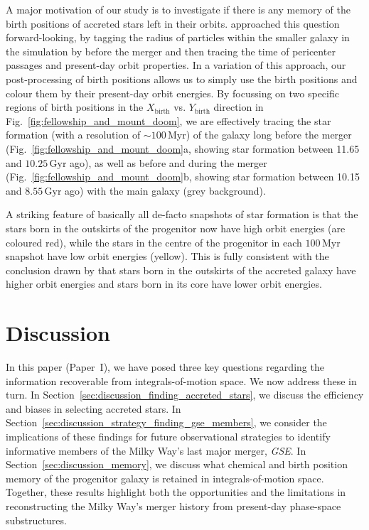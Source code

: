 \documentclass[fleqn,usenatbib]{mnras}
\begin{document}
A major motivation of our study is to investigate if there is any memory of the birth positions of accreted stars left in their orbits. \citet{Skuladottir2025} approached this question forward-looking, by tagging the radius of particles within the smaller galaxy in the simulation by \citet{Mori2024} before the merger and then tracing the time of pericenter passages and present-day orbit properties. In a variation of this approach, our post-processing of birth positions allows us to simply use the birth positions and colour them by their present-day orbit energies. By focussing on two specific regions of birth positions in the $X_\mathrm{birth}$ vs. $Y_\mathrm{birth}$ direction in Fig.~\ref{fig:fellowship_and_mount_doom}, we are effectively tracing the star formation (with a resolution of $\sim 100\,\mathrm{Myr}$) of the galaxy long before the merger (Fig.~\ref{fig:fellowship_and_mount_doom}a, showing star formation between 11.65 and $10.25\,\mathrm{Gyr}$ ago), as well as before and during the merger (Fig.~\ref{fig:fellowship_and_mount_doom}b, showing star formation between 10.15 and $8.55\,\mathrm{Gyr}$ ago) with the main galaxy (grey background).

A striking feature of basically all de-facto snapshots of star formation is that the stars born in the outskirts of the progenitor now have high orbit energies (are coloured red), while the stars in the centre of the progenitor in each $100\,\mathrm{Myr}$ snapshot have low orbit energies (yellow). This is fully consistent with the conclusion drawn by \citet{Skuladottir2025} that stars born in the outskirts of the accreted galaxy have higher orbit energies and stars born in its core have lower orbit energies.

\section{Discussion}
\label{sec:discussion}

In this paper (Paper~I), we have posed three key questions regarding the information recoverable from integrals-of-motion space. We now address these in turn. In Section~\ref{sec:discussion_finding_accreted_stars}, we discuss the efficiency and biases in selecting accreted stars. In Section~\ref{sec:discussion_strategy_finding_gse_members}, we consider the implications of these findings for future observational strategies to identify informative members of the Milky Way’s last major merger, \textit{GSE}. In Section~\ref{sec:discussion_memory}, we discuss what chemical and birth position memory of the progenitor galaxy is retained in integrals-of-motion space. Together, these results highlight both the opportunities and the limitations in reconstructing the Milky Way’s merger history from present-day phase-space substructures.
\end{document}
